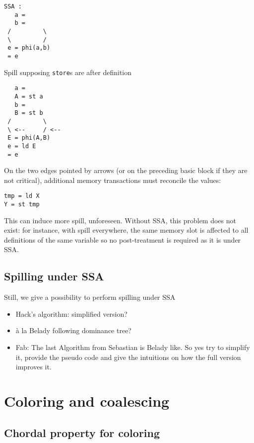 {\begin{minipage}{.45\textwidth}
\begin{verbatim}
SSA :
   a =
   b =
 /         \
 \         /
 e = phi(a,b)
 = e
\end{verbatim}
\end{minipage}
\begin{minipage}{.45\textwidth}
Spill supposing {\tt store}s are after definition
\begin{verbatim}
   a =
   A = st a
   b =
   B = st b
 /         \
 \ <--     / <--
 E = phi(A,B)
 e = ld E
 = e
\end{verbatim}
\end{minipage}

On the two edges pointed by arrows (or on the preceding basic block if they are 
not critical), additional memory transactions must reconcile the values:
\begin{verbatim}
tmp = ld X
Y = st tmp
\end{verbatim}

This can induce more spill, unforeseen.
Without SSA, this problem does not exist: for instance, with spill everywhere, 
the same memory slot is affected to all definitions of the same variable so no 
post-treatment is required as it is under SSA.



\subsection{Spilling under SSA}
Still, we give a possibility to perform spilling under SSA
\begin{itemize}
  \item Hack's algorithm: simplified version?
  \item \`a la Belady following dominance tree?

  \item Fab: The last Algorithm from Sebastian is Belady like. So yes try to simplify it, provide the pseudo code and give the intuitions on how the full version improves it.

\end{itemize}


\cite{Braun09:spilling-ssa}


\section{Coloring and coalescing}
\subsection{Chordal property for coloring}

}
